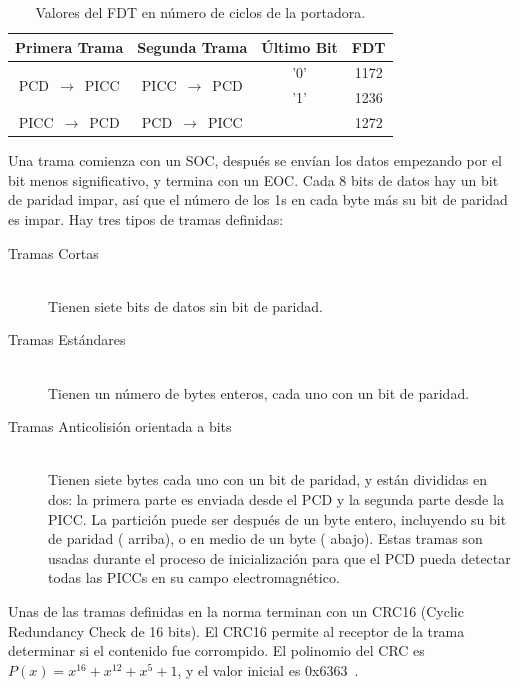 \documentclass[a4paper, twoside, 11pt]{report}
\begin{document}
\begin{table}[htb]
  \centering
  \begin{tabular}{|c|c|c|c|}
    \hline
    \textbf{Primera Trama} & \textbf{Segunda Trama} & \textbf{Último Bit} & \textbf{FDT} \\
    \hline
    \multirow{2}{*}{PCD~$\rightarrow$~PICC} & \multirow{2}{*}{PICC~$\rightarrow$~PCD} & '0' & 1172  \\
    \cline{3-4}
    & & '1' & 1236 \\
    \hline
    PICC~$\rightarrow$~PCD & PCD~$\rightarrow$~PICC & & 1272 \\
    \hline
  \end{tabular}
  \caption{Valores del FDT en número de ciclos de la portadora.}
  \label{tab:fdt}
\end{table}

Una trama comienza con un SOC, después se envían los datos empezando por el bit menos significativo, y termina con un EOC. Cada 8 bits de datos hay un bit de paridad impar, así que el número de los 1s en cada byte más su bit de paridad es impar. Hay tres tipos de tramas definidas:

\begin{description}
  \item [Tramas Cortas] \hfill \\ Tienen siete bits de datos sin bit de paridad.
  \item[Tramas Estándares] \hfill \\ Tienen un número de bytes enteros, cada uno con un bit de paridad.
  \item[Tramas Anticolisión orientada a bits] \hfill \\ Tienen siete bytes cada uno con un bit de paridad, y están divididas en dos: la primera parte es enviada desde el PCD y la segunda parte desde la PICC. La partición puede ser después de un byte entero, incluyendo su bit de paridad ( arriba), o en medio de un byte ( abajo). Estas tramas son usadas durante el proceso de inicialización para que el PCD pueda detectar todas las PICCs en su campo electromagnético.
\end{description}

Unas de las tramas definidas en la norma terminan con un CRC16 (Cyclic Redundancy Check de 16 bits). El CRC16 permite al receptor de la trama determinar si el contenido fue corrompido. El polinomio del CRC es $P\left(x\right) = x^{16} + x^{12} + x^{5} + 1$, y el valor inicial es 0x6363~\cite{iso14443-3}\cite{iso13239}.
\end{document}
